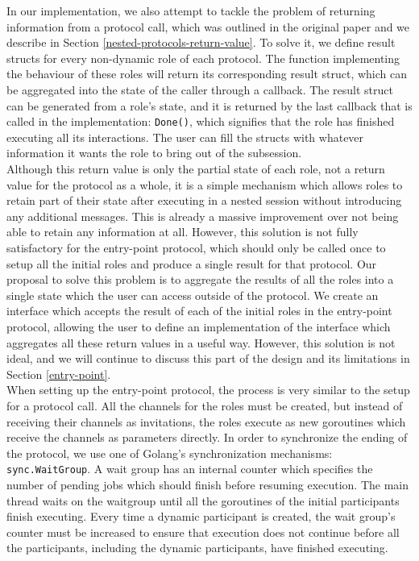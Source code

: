 \documentclass[12pt,twoside]{report}
\begin{document}
In our implementation, we also attempt to tackle the problem of returning information from a protocol call, which was outlined in the original paper\cite{nestedprotocols} and we describe in Section \ref{nested-protocols-return-value}. To solve it, we define result structs for every non-dynamic role of each protocol. The function implementing the behaviour of these roles will return its corresponding result struct, which can be aggregated into the state of the caller through a callback. The result struct can be generated from a role's state, and it is returned by the last callback that is called in the implementation: \texttt{Done()}, which signifies that the role has finished executing all its interactions. The user can fill the structs with whatever information it wants the role to bring out of the subsession.\\

Although this return value is only the partial state of each role, not a return value for the protocol as a whole, it is a simple mechanism which allows roles to retain part of their state after executing in a nested session without introducing any additional messages. This is already a massive improvement over not being able to retain any information at all. However, this solution is not fully satisfactory for the entry-point protocol, which should only be called once to setup all the initial roles and produce a single result for that protocol. Our proposal to solve this problem is to aggregate the results of all the roles into a single state which the user can access outside of the protocol. We create an interface which accepts the result of each of the initial roles in the entry-point protocol, allowing the user to define an implementation of the interface which aggregates all these return values in a useful way. However, this solution is not ideal, and we will continue to discuss this part of the design and its limitations in Section \ref{entry-point}.\\

When setting up the entry-point protocol, the process is very similar to the setup for a protocol call. All the channels for the roles must be created, but instead of receiving their channels as invitations, the roles execute as new goroutines which receive the channels as parameters directly. In order to synchronize the ending of the protocol, we use one of Golang's synchronization mechanisms: \texttt{sync.WaitGroup}. A wait group has an internal counter which specifies the number of pending jobs which should finish before resuming execution. The main thread waits on the waitgroup until all the goroutines of the initial participants finish executing. Every time a dynamic participant is created, the wait group's counter must be increased to ensure that execution does not continue before all the participants, including the dynamic participants, have finished executing.
\end{document}
